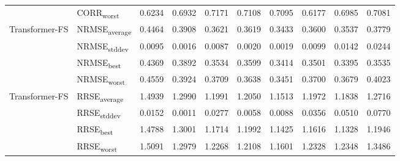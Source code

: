 {\begin{longtable}{l l c c c c c c c c}
 & CORR\textsubscript{worst} & 0.6234 & 0.6932 & 0.7171 & 0.7108 & 0.7095 & 0.6177 & 0.6985 & 0.7081 \\
\cmidrule(lr){2-10}
\multirow{4}{*}{Transformer-FS} & NRMSE\textsubscript{average} & 0.4464 & 0.3908 & 0.3621 & 0.3619 & 0.3433 & 0.3600 & 0.3537 & 0.3779 \\
 & NRMSE\textsubscript{stddev} & 0.0095 & 0.0016 & 0.0087 & 0.0020 & 0.0019 & 0.0099 & 0.0142 & 0.0244 \\
 & NRMSE\textsubscript{best} & 0.4369 & 0.3892 & 0.3534 & 0.3599 & 0.3414 & 0.3501 & 0.3395 & 0.3535 \\
 & NRMSE\textsubscript{worst} & 0.4559 & 0.3924 & 0.3709 & 0.3638 & 0.3451 & 0.3700 & 0.3679 & 0.4023 \\
\cmidrule(lr){2-10}
\multirow{4}{*}{Transformer-FS} & RRSE\textsubscript{average} & 1.4939 & 1.2990 & 1.1991 & 1.2050 & 1.1513 & 1.1972 & 1.1838 & 1.2716 \\
 & RRSE\textsubscript{stddev} & 0.0152 & 0.0011 & 0.0277 & 0.0058 & 0.0088 & 0.0356 & 0.0510 & 0.0770 \\
 & RRSE\textsubscript{best} & 1.4788 & 1.3001 & 1.1714 & 1.1992 & 1.1425 & 1.1616 & 1.1328 & 1.1946 \\
 & RRSE\textsubscript{worst} & 1.5091 & 1.2979 & 1.2268 & 1.2108 & 1.1601 & 1.2328 & 1.2348 & 1.3486 \\
\cmidrule(lr){2-10}
\end{longtable}
}